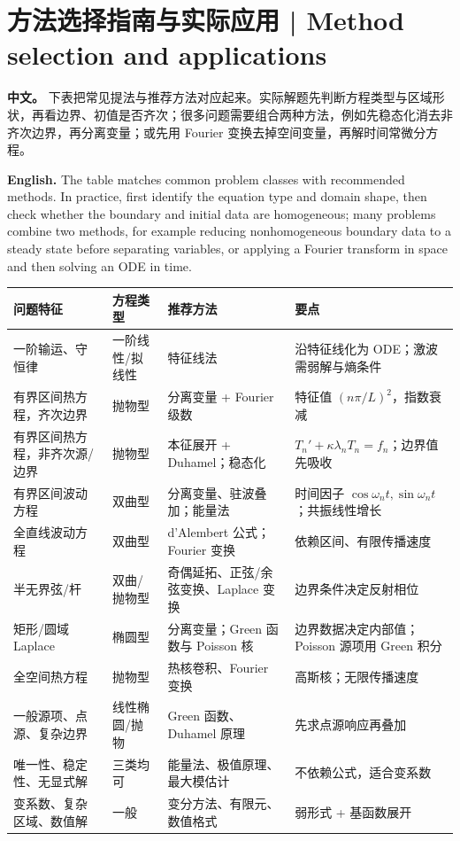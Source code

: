\documentclass[UTF8,11pt,a4paper]{ctexart}
\newcommand{\APS}[2]{\par\noindent\textbf{中文。} #1\par\noindent\textbf{English.} #2\par\smallskip}
\begin{document}
\section[方法选择与应用]{方法选择指南与实际应用 | Method selection and applications}
\APS{下表把常见提法与推荐方法对应起来。实际解题先判断方程类型与区域形状，再看边界、初值是否齐次；很多问题需要组合两种方法，例如先稳态化消去非齐次边界，再分离变量；或先用 Fourier 变换去掉空间变量，再解时间常微分方程。}{The table matches common problem classes with recommended methods. In practice, first identify the equation type and domain shape, then check whether the boundary and initial data are homogeneous; many problems combine two methods, for example reducing nonhomogeneous boundary data to a steady state before separating variables, or applying a Fourier transform in space and then solving an ODE in time.}
\noindent\small
\begin{longtable}{@{}>{\raggedright\arraybackslash}p{2.4cm}>{\raggedright\arraybackslash}p{2.5cm}>{\raggedright\arraybackslash}p{4.4cm}>{\raggedright\arraybackslash}p{5.4cm}@{}}
\hline
\textbf{问题特征} & \textbf{方程类型} & \textbf{推荐方法} & \textbf{要点} \\
\hline
\endhead
一阶输运、守恒律 & 一阶线性/拟线性 & 特征线法 & 沿特征线化为 ODE；激波需弱解与熵条件 \\
\hline
有界区间热方程，齐次边界 & 抛物型 & 分离变量 + Fourier 级数 & 特征值 $(n\pi/L)^2$，指数衰减 \\
\hline
有界区间热方程，非齐次源/边界 & 抛物型 & 本征展开 + Duhamel；稳态化 & $T_n'+\kappa\lambda_nT_n=f_n$；边界值先吸收 \\
\hline
有界区间波动方程 & 双曲型 & 分离变量、驻波叠加；能量法 & 时间因子 $\cos\omega_nt,\sin\omega_nt$；共振线性增长 \\
\hline
全直线波动方程 & 双曲型 & d'Alembert 公式；Fourier 变换 & 依赖区间、有限传播速度 \\
\hline
半无界弦/杆 & 双曲/抛物型 & 奇偶延拓、正弦/余弦变换、Laplace 变换 & 边界条件决定反射相位 \\
\hline
矩形/圆域 Laplace & 椭圆型 & 分离变量；Green 函数与 Poisson 核 & 边界数据决定内部值；Poisson 源项用 Green 积分 \\
\hline
全空间热方程 & 抛物型 & 热核卷积、Fourier 变换 & 高斯核；无限传播速度 \\
\hline
一般源项、点源、复杂边界 & 线性椭圆/抛物 & Green 函数、Duhamel 原理 & 先求点源响应再叠加 \\
\hline
唯一性、稳定性、无显式解 & 三类均可 & 能量法、极值原理、最大模估计 & 不依赖公式，适合变系数 \\
\hline
变系数、复杂区域、数值解 & 一般 & 变分方法、有限元、数值格式 & 弱形式 + 基函数展开 \\
\hline
\end{longtable}
\end{document}
